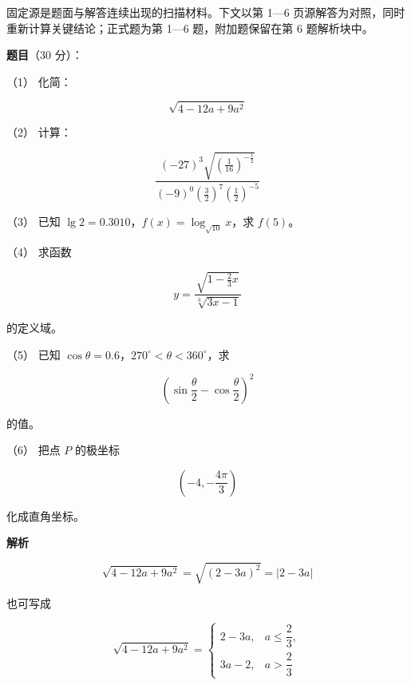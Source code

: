 

\begin{gktip}
固定源是题面与解答连续出现的扫描材料。下文以第 1—6 页源解答为对照，同时重新计算关键结论；正式题为第 1—6 题，附加题保留在第 6 题解析块中。
\end{gktip}

\begin{answer}

\textbf{题目}（30 分）：

（1） 化简：

\nopagebreak[4]
\[
\sqrt{4-12a+9a^2}
\]

（2） 计算：

\nopagebreak[4]
\[
\frac{(-27)^3\sqrt{\left(\frac1{16}\right)^{-\frac12}}}
{(-9)^0\left(\frac32\right)^7\left(\frac12\right)^{-5}}
\]

（3） 已知 $\lg2=0.3010$，$f(x)=\log_{\sqrt{10}}x$，求 $f(5)$。

（4） 求函数

\nopagebreak[4]
\[
y=\frac{\sqrt{1-\frac23x}}{\sqrt[3]{3x-1}}
\]

的定义域。

（5） 已知 $\cos\theta=0.6$，$270^\circ<\theta<360^\circ$，求

\nopagebreak[4]
\[
\left(\sin\frac\theta2-\cos\frac\theta2\right)^2
\]

的值。

（6） 把点 $P$ 的极坐标

\nopagebreak[4]
\[
\left(-4,-\frac{4\pi}{3}\right)
\]

化成直角坐标。

\textbf{解析}


\nopagebreak[4]
\[
\sqrt{4-12a+9a^2}=\sqrt{(2-3a)^2}=\lvert2-3a\rvert
\]

也可写成

\nopagebreak[4]
\[
\sqrt{4-12a+9a^2}=\begin{cases}
2-3a,&a\le\dfrac23,\\
3a-2,&a>\dfrac23
\end{cases}
\]


\end{answer}
